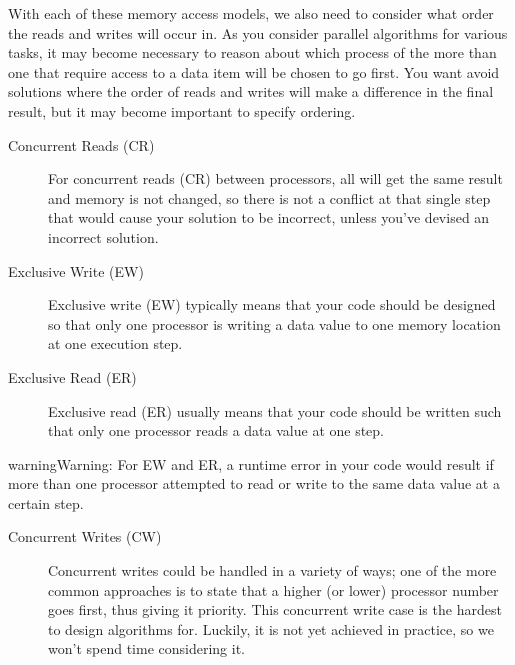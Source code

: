 \documentclass[letterpaper,10pt,openany,oneside]{sphinxmanual}
\begin{document}
With each of these memory access models, we also need to consider what order the reads and writes will occur in. As you consider parallel algorithms for various tasks, it may become necessary to reason about which process of the more than one that require access to a data item will be chosen to go first. You want avoid solutions where the order of reads and writes will make a difference in the final result, but it may become important to specify ordering.
\begin{description}
\item[{Concurrent Reads (CR)}] \leavevmode{}\label{ParallelMachineModels/ParallelMachineModels:term-concurrent-reads-cr}
For concurrent reads (CR) between processors, all will get the same result and memory is not changed, so there is not a conflict at that single step that would cause your solution to be incorrect, unless you’ve devised an incorrect solution.

\end{description}
\begin{description}
\item[{Exclusive Write (EW)}] \leavevmode{}\label{ParallelMachineModels/ParallelMachineModels:term-exclusive-write-ew}
Exclusive write (EW) typically means that your code should be designed so that only one processor is writing a data value to one memory location at one execution step.

\end{description}
\begin{description}
\item[{Exclusive Read (ER)}] \leavevmode{}\label{ParallelMachineModels/ParallelMachineModels:term-exclusive-read-er}
Exclusive read (ER) usually means that your code should be written such that only one processor reads a data value at one step.

\end{description}

\begin{notice}{warning}{Warning:}
For EW and ER, a runtime error in your code would result if more than one processor attempted to read or write to the same data value at a certain step.
\end{notice}
\begin{description}
\item[{Concurrent Writes (CW)}] \leavevmode{}\label{ParallelMachineModels/ParallelMachineModels:term-concurrent-writes-cw}
Concurrent writes could be handled in a variety of ways; one of the more common approaches is to state that a higher (or lower) processor number goes first, thus giving it priority.  This concurrent write case is the hardest to design algorithms for.  Luckily, it is not yet achieved in practice, so we won’t spend time considering it.

\end{description}
\end{document}
